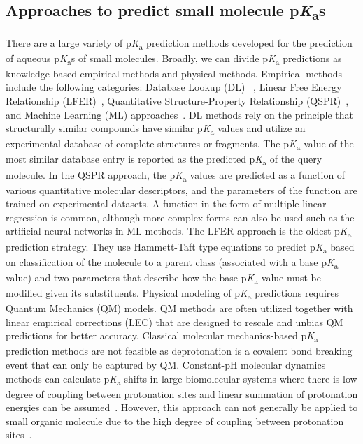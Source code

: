\documentclass[9pt,lineno,final]{elife}
\newcommand{\pKa}{p\textit{K}\textsubscript{a}}
\begin{document}
\subsection{Approaches to predict small molecule \pKa{}s}

There are a large variety of \pKa{} prediction methods developed for the prediction of aqueous \pKa{}s of small molecules. 
Broadly, we can divide \pKa{} predictions as knowledge-based empirical methods and physical methods. 
Empirical methods include the following categories: Database Lookup (DL) ~\citep{Kogej_Muresan_2005}, Linear Free Energy Relationship (LFER)~\citep{PerrinDDpaPf, Hammett_1940, Taft:1959:J.Am.Chem.Soc.}, Quantitative Structure-Property Relationship (QSPR)~\citep{Xing:2003:J.Chem.Inf.Comput.Sci., Zhang:2006:J.Chem.Inf.Model., Cruciani:2009:Chem.Biodivers., Milletti:2007:J.Chem.Inf.Model.}, and Machine Learning (ML) approaches~\citep{Fraczkiewicz:2013:ReferenceModuleinChemistryMolecularSciencesandChemicalEngineering, simulation-plus-pKa}. 
DL methods rely on the principle that structurally similar compounds have similar \pKa{} values and utilize an experimental database of complete structures or fragments. 
The \pKa{} value of the most similar database entry is reported as the predicted \pKa{} of the query molecule.
In the QSPR approach, the \pKa{} values are predicted as a function of various quantitative molecular descriptors, and the parameters of the function are trained on experimental datasets. 
A function in the form of multiple linear regression is common, although more complex forms can also be used such as the artificial neural networks in ML methods.
The LFER approach is the oldest \pKa{} prediction strategy. 
They use Hammett-Taft type equations to predict \pKa{} based on classification of the molecule to a parent class (associated with a base \pKa{} value) and two parameters that describe how the base \pKa{} value must be modified given its substituents. 
Physical modeling of \pKa{} predictions requires Quantum Mechanics (QM) models. 
QM methods are often utilized together with linear empirical corrections (LEC) that are designed to rescale and unbias QM predictions for better accuracy. 
Classical molecular mechanics-based \pKa{} prediction methods are not feasible as deprotonation is a covalent bond breaking event that can only be captured by QM. 
Constant-pH molecular dynamics methods can calculate \pKa{} shifts in large biomolecular systems where there is low degree of coupling between protonation sites and linear summation of protonation energies can be assumed~\citep{Radak:2017:J.Chem.TheoryComput.}. 
However, this approach can not generally be applied to small organic molecule due to the high degree of coupling between protonation sites~\citep{Gunner:2020:J.Comput.AidedMol.Des., Ullmann:2003:J.Phys.Chem.B, Yang:1993:ProteinsStructFunctGenet}. 
\end{document}
